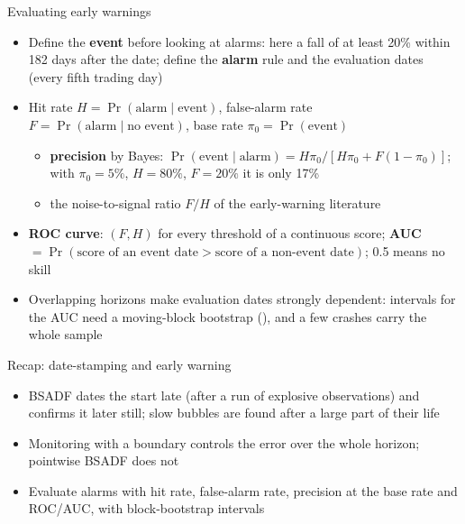 \begin{frame}{Evaluating early warnings}
\itemsize{\small}
\begin{itemize}
    \item Define the \textbf{event} before looking at alarms: here a fall of at least 20\% within 182 days after the date; define the \textbf{alarm} rule and the evaluation dates (every fifth trading day)
    \item Hit rate $H = \Pr(\text{alarm} \mid \text{event})$, false-alarm rate $F = \Pr(\text{alarm} \mid \text{no event})$, base rate $\pi_0 = \Pr(\text{event})$
    \begin{itemize}
        \item \textbf{precision} by Bayes: $\Pr(\text{event} \mid \text{alarm}) = H\pi_0 / [H\pi_0 + F(1 - \pi_0)]$; with $\pi_0 = 5\%$, $H = 80\%$, $F = 20\%$ it is only 17\%
        \item the noise-to-signal ratio $F/H$ of the early-warning literature 
    \end{itemize}
    \item \textbf{ROC curve}: $(F, H)$ for every threshold of a continuous score; \textbf{AUC} $= \Pr(\text{score of an event date} > \text{score of a non-event date})$; 0.5 means no skill
    \item Overlapping horizons make evaluation dates strongly dependent: intervals for the AUC need a moving-block bootstrap (), and a few crashes carry the whole sample
\end{itemize}
\end{frame}

\begin{frame}{Recap: date-stamping and early warning}
\itemsize{\small}
\begin{itemize}
    \item BSADF dates the start late (after a run of explosive observations) and confirms it later still; slow bubbles are found after a large part of their life
    \item Monitoring with a boundary controls the error over the whole horizon; pointwise BSADF does not
    \item Evaluate alarms with hit rate, false-alarm rate, precision at the base rate and ROC/AUC, with block-bootstrap intervals
\end{itemize}
\end{frame}


